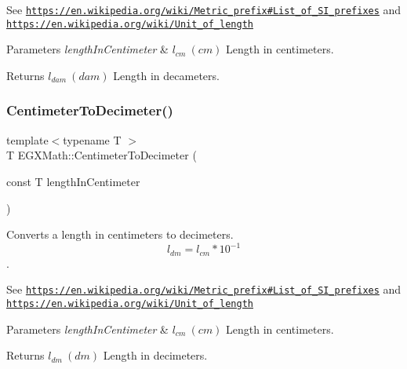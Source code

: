 See \href{https://en.wikipedia.org/wiki/Metric_prefix#List_of_SI_prefixes}{\tt https\+://en.\+wikipedia.\+org/wiki/\+Metric\+\_\+prefix\#\+List\+\_\+of\+\_\+\+S\+I\+\_\+prefixes} and \href{https://en.wikipedia.org/wiki/Unit_of_length}{\tt https\+://en.\+wikipedia.\+org/wiki/\+Unit\+\_\+of\+\_\+length} 
\begin{DoxyParams}{Parameters}
{\em length\+In\+Centimeter} & $ l_{cm}\ (cm)$ Length in centimeters. \\
\hline
\end{DoxyParams}
\begin{DoxyReturn}{Returns}
$ l_{dam}\ (dam)$ Length in decameters. 
\end{DoxyReturn}
\mbox{\label{group___e_g_x_math-_conversions-_length_conversions-_s_i-_centimeter-_s_i_gae1263088b67f23124cc7770d66fbb38b}} 
\subsubsection{\texorpdfstring{Centimeter\+To\+Decimeter()}{CentimeterToDecimeter()}}
{\footnotesize\ttfamily template$<$typename T $>$ \\
T E\+G\+X\+Math\+::\+Centimeter\+To\+Decimeter (\begin{DoxyParamCaption}\item[{const T}]{length\+In\+Centimeter }\end{DoxyParamCaption})}



Converts a length in centimeters to decimeters. \[ l_{dm}=l_{cm} * 10^{-1} \]. 

See \href{https://en.wikipedia.org/wiki/Metric_prefix#List_of_SI_prefixes}{\tt https\+://en.\+wikipedia.\+org/wiki/\+Metric\+\_\+prefix\#\+List\+\_\+of\+\_\+\+S\+I\+\_\+prefixes} and \href{https://en.wikipedia.org/wiki/Unit_of_length}{\tt https\+://en.\+wikipedia.\+org/wiki/\+Unit\+\_\+of\+\_\+length} 
\begin{DoxyParams}{Parameters}
{\em length\+In\+Centimeter} & $ l_{cm}\ (cm)$ Length in centimeters. \\
\hline
\end{DoxyParams}
\begin{DoxyReturn}{Returns}
$ l_{dm}\ (dm)$ Length in decimeters. 
\end{DoxyReturn}
\mbox{\label{group___e_g_x_math-_conversions-_length_conversions-_s_i-_centimeter-_s_i_ga8b69e702b6a245a68f57d52474f21c1a}} 
